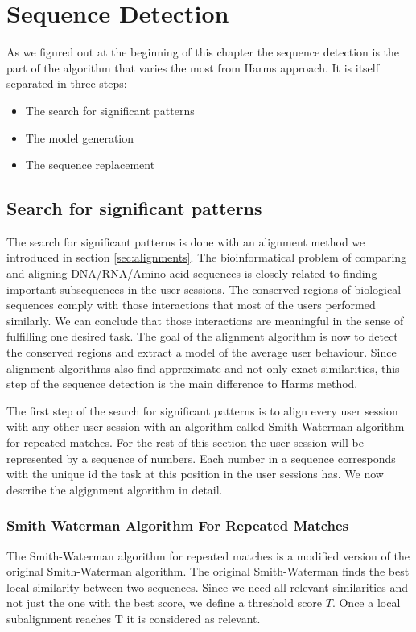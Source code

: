 \section{Sequence Detection}
As we figured out at the beginning of this chapter the sequence detection is the part of the algorithm that varies the most from Harms approach.
It is itself separated in three steps:
\begin{itemize}
	\item The search for significant patterns
	\item The model generation
	\item The sequence replacement
\end{itemize}

\subsection{Search for significant patterns}		
The search for significant patterns is done with an alignment method we introduced in section \ref{sec:alignments}. 
The bioinformatical problem of comparing and aligning DNA/RNA/Amino acid sequences is closely related to finding important subsequences in the user sessions. 
The conserved regions of biological sequences comply with those interactions that most of the users performed similarly. 
We can conclude that those interactions are meaningful in the sense of fulfilling one desired task.
The goal of the alignment algorithm is now to detect the conserved regions and extract a model of the average user behaviour. 
Since alignment algorithms also find approximate and not only exact similarities, this step of the sequence detection is the main difference to Harms method.

The first step of the search for significant patterns is to align every user session with any other user session with an algorithm called Smith-Waterman algorithm for repeated matches.
For the rest of this section the user session will be represented by a sequence of numbers. Each number in a sequence corresponds with the unique id the task at this position in the user sessions has.
We now describe the algignment algorithm in detail.

\subsubsection{Smith Waterman Algorithm For Repeated Matches}
The Smith-Waterman algorithm for repeated matches\cite{durbin1998} is a modified version of the original Smith-Waterman algorithm\cite{waterman1981}.
The original Smith-Waterman finds the best local similarity between two sequences.
Since we need all relevant similarities and not just the one with the best score, we define a threshold score $T$.
Once a local subalignment reaches T it is considered as relevant.

